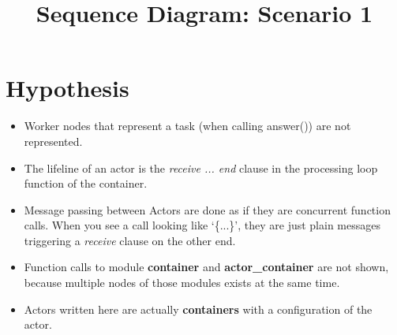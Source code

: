 \documentclass{article}
\begin{document}
\title{Sequence Diagram: Scenario 1}
\date{}

\maketitle
\thispagestyle{empty}
\section*{Hypothesis}

\begin{itemize}
	\item Worker nodes that represent a task (when calling answer()) are not 
	represented.
	\item The lifeline of an actor is the \textit{receive ... end} clause
	in the processing loop function of the container.
	\item Message passing between Actors are done as if they are concurrent
	function calls. When you see a call looking like `\{...\}', they are 
	just plain messages triggering a \textit{receive} clause on the other end.
	\item Function calls to module \textbf{container} and 
	\textbf{actor\_container} are not shown, because multiple nodes of 
	those modules exists at the same time.
	\item Actors written here are actually \textbf{containers} with a 
	configuration of the actor.
\end{itemize}
\end{document}
